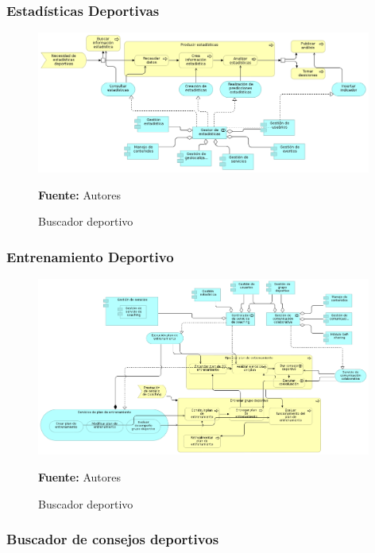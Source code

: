 \subsubsection{Estadísticas Deportivas}

\begin{figure}[!htb]
  \begin{center}
    \includegraphics[width=11cm]{./imagenes/application_usage/estadisticasdeportivas.png}
    \caption{Buscador deportivo}
    \label{fig:BF_BuscadorDeportivo}
    \textbf{Fuente:}  Autores
  \end{center}
\end{figure}

\subsubsection{Entrenamiento Deportivo}

\begin{figure}[!htb]
  \begin{center}
    \includegraphics[width=11cm]{./imagenes/application_usage/entrenamientodeportivo.png}
    \caption{Buscador deportivo}
    \label{fig:BF_BuscadorDeportivo}
    \textbf{Fuente:}  Autores
  \end{center}
\end{figure}

\subsubsection{Buscador de consejos deportivos}

